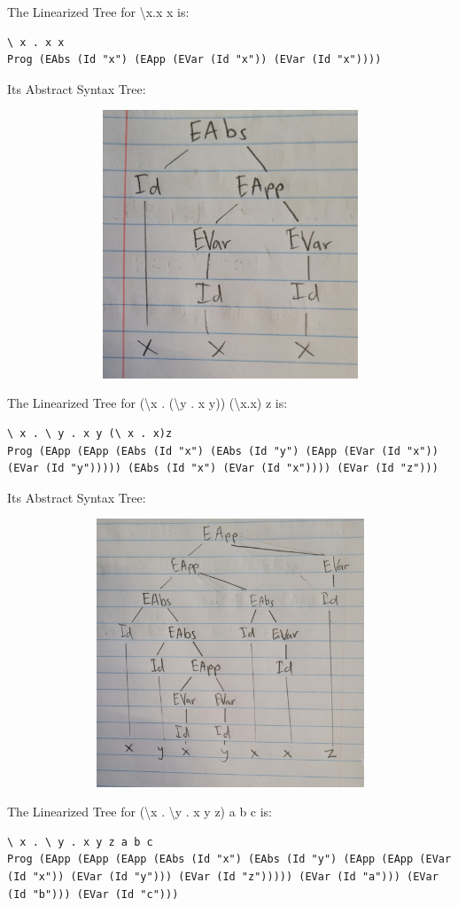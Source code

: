 \documentclass{article}
\theoremstyle{theorem}
\theoremstyle{definition}
\theoremstyle{remark}
\begin{document}
The Linearized Tree for \textbackslash x.x x is:
\begin{lstlisting}
\ x . x x
Prog (EAbs (Id "x") (EApp (EVar (Id "x")) (EVar (Id "x"))))
\end{lstlisting}

Its Abstract Syntax Tree:

\includegraphics[width=15cm, height=8cm]{Report Images/week5_6.jpg}

The Linearized Tree for (\textbackslash x . (\textbackslash y . x y)) (\textbackslash x.x) z is:
\begin{lstlisting}
\ x . \ y . x y (\ x . x)z
Prog (EApp (EApp (EAbs (Id "x") (EAbs (Id "y") (EApp (EVar (Id "x")) (EVar (Id "y"))))) (EAbs (Id "x") (EVar (Id "x")))) (EVar (Id "z")))
\end{lstlisting}

Its Abstract Syntax Tree:

\includegraphics[width=15cm, height=8cm]{Report Images/week5_7.jpg}

The Linearized Tree for (\textbackslash x . \textbackslash y . x y z) a b c is:
\begin{lstlisting}
\ x . \ y . x y z a b c
Prog (EApp (EApp (EApp (EAbs (Id "x") (EAbs (Id "y") (EApp (EApp (EVar (Id "x")) (EVar (Id "y"))) (EVar (Id "z"))))) (EVar (Id "a"))) (EVar (Id "b"))) (EVar (Id "c")))
\end{lstlisting}
\end{document}
